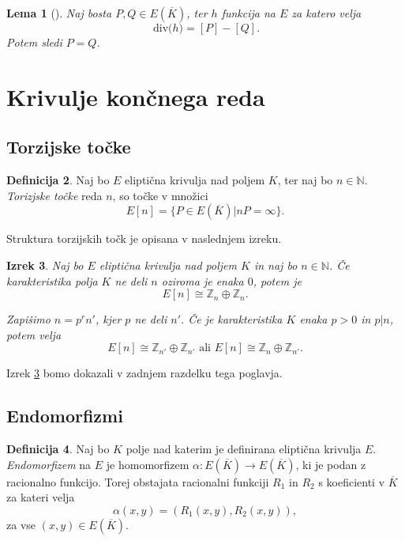\documentclass[12pt,a4paper,twoside]{article}
\theoremstyle{definition} %
\newtheorem{definicija}{Definicija}[section]
\theoremstyle{plain} %
\newtheorem{lema}[definicija]{Lema}
\newtheorem{izrek}[definicija]{Izrek}
\numberwithin{equation}{section}  %
\newcommand{\N}{\mathbb N}
\newcommand{\E}[1]{E({#1})}
\newcommand{\Div}[1]{\ \text{div(}{#1}\text{)}}
\begin{document}
\begin{lema}[]
\label{lema 11.3}
Naj bosta $P,Q \in \E{\overline{K}}$, ter $h$ funkcija na $E$ za katero velja
$$\Div{h}=[P]-[Q].$$
Potem sledi $P=Q$.
\end{lema}
\newpage

\section{Krivulje končnega reda}
\subsection{Torzijske točke}

\begin{definicija}
Naj bo $E$ eliptična krivulja nad poljem $K$, ter naj bo $n\in \N$. \emph{Torizjske točke} reda $n$, so točke v množici
$$E[n] = \{ P \in \E{\overline{K}} | nP = \infty \}.$$
\end{definicija}

Struktura torzijskih točk je opisana v naslednjem izreku.

\begin{izrek}
\label{IzrekTor}
Naj bo $E$ eliptična krivulja nad poljem $K$ in naj bo $n \in \N$. Če karakteristika polja $K$ ne deli $n$ oziroma je enaka $0$, potem je
$$E[n] \cong \mathbb{Z}_n \oplus \mathbb{Z}_n.$$

Zapišimo $n=p^rn'$, kjer $p$ ne deli $n'$. Če je karakteristika $K$ enaka $p >0$ in $p|n$, potem velja
$$E[n] \cong \mathbb{Z}_{n'} \oplus \mathbb{Z}_{n'} \text{ ali } E[n] \cong \mathbb{Z}_n \oplus \mathbb{Z}_{n'}.$$

\end{izrek}

Izrek \ref{IzrekTor} bomo dokazali v zadnjem razdelku tega poglavja.

\subsection{Endomorfizmi}
\label{endomorfizmi}

\begin{definicija}
Naj bo $K$ polje nad katerim je definirana eliptična krivulja $E$.
\emph{Endomorfizem} na $E$ je homomorfizem $\alpha: \E{\overline{K}} \rightarrow \E{\overline{K}} $, ki je podan z racionalno funkcijo. Torej obstajata racionalni funkciji $R_1$ in $R_2$ s koeficienti v $\overline{K}$ za kateri velja
$$\alpha(x,y) = (R_1(x,y),R_2(x,y)),$$
za vse $(x,y) \in \E{\overline{K}}$.
\end{definicija}
\end{document}
